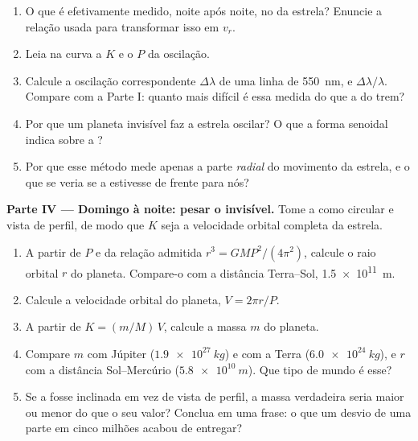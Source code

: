 \begin{problem}
\begin{enumerate}[resume]
  \item O que é efetivamente medido, noite após noite, no
        \emph{} da estrela? Enuncie a relação usada para
        transformar isso em $v_r$.
  \item Leia na curva a  $K$ e o  $P$ da oscilação.
  \item Calcule a oscilação correspondente $\Delta\lambda$ de uma linha
        de \qty{550}{nm}, e $\Delta\lambda/\lambda$. Compare com a Parte
        I: quanto mais difícil é essa medida do que a do trem?
  \item Por que um planeta invisível faz a estrela oscilar? O que a forma
        senoidal indica sobre a ?
  \item Por que esse método mede apenas a parte \emph{radial} do
        movimento da estrela, e o que se veria se a  estivesse de
        frente para nós?
\end{enumerate}

\medskip
\noindent\textbf{Parte IV --- Domingo à noite: pesar o invisível.}
Tome a  como circular e vista de perfil, de modo que $K$ seja a
velocidade orbital completa da estrela.
\begin{enumerate}[resume]
  \item A partir de $P$ e da relação admitida $r^3 = G M P^2/(4\pi^2)$,
        calcule o raio orbital $r$ do planeta. Compare-o com a distância
        Terra--Sol, \qty{1.5e11}{m}.
  \item Calcule a velocidade orbital do planeta, $V = 2\pi r/P$.
  \item A partir de $K = (m/M)\,V$, calcule a massa $m$ do planeta.
  \item Compare $m$ com Júpiter ($\qty{1.9e27}{kg}$) e com a Terra
        ($\qty{6.0e24}{kg}$), e $r$ com a distância Sol--Mercúrio
        ($\qty{5.8e10}{m}$). Que tipo de mundo é esse?
  \item Se a  fosse inclinada em vez de vista de perfil, a massa
        verdadeira seria maior ou menor do que o seu valor? Conclua em
        uma frase: o que um desvio  de uma parte em cinco
        milhões acabou de entregar?
\end{enumerate}
\end{problem}
